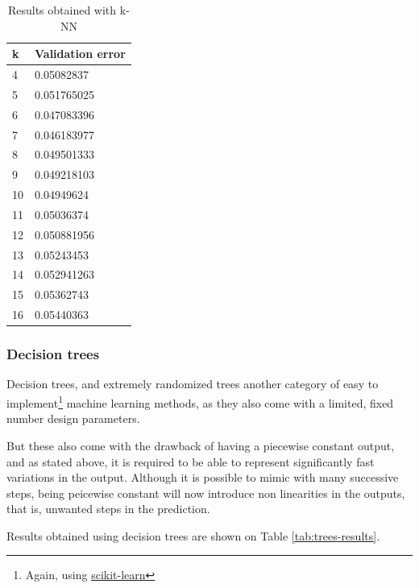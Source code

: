 \begin{table}[h]
    \centering
    \begin{tabular}{|l|l|}
        \hline
        k & Validation error \\ \hline
        4  & 0.05082837 \\
        5  & 0.051765025 \\
        6  & 0.047083396 \\
        7  & 0.046183977 \\
        8  & 0.049501333 \\
        9  & 0.049218103 \\
        10 & 0.04949624 \\
        11 & 0.05036374 \\
        12 & 0.050881956 \\
        13 & 0.05243453 \\
        14 & 0.052941263 \\
        15 & 0.05362743 \\
        16 & 0.05440363 \\ \hline
    \end{tabular}
    \caption{Results obtained with k-NN}
    \label{tab:results-knn}
\end{table}

\subsubsection{Decision trees}

Decision trees, and extremely randomized trees \cite{extremely-randomized-trees} another category of easy to implement\footnote{Again, using \href{https://scikit-learn.org/stable/modules/ensemble.html\#forests-of-randomized-trees}{scikit-learn}} machine learning methods, as they also come with a limited, fixed number design parameters.

But these also come with the drawback of having a piecewise constant output, and as stated above, it is required to be able to represent significantly fast variations in the output. Although it is possible to mimic with many successive steps, being peicewise constant will now introduce non linearities in the outputs, that is, unwanted steps in the prediction.

Results obtained using decision trees are shown on Table \ref{tab:trees-results}.


